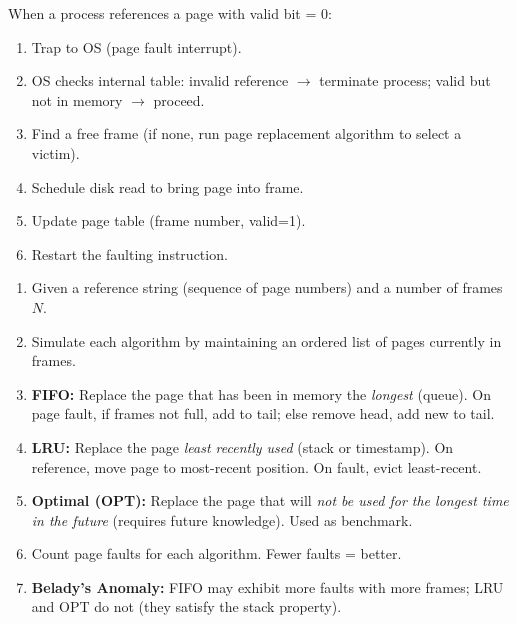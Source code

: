 \documentclass[11pt]{article}
\newcommand{\cle}[1]{{\popxbold\color{popdark}#1}}
\begin{document}
\begin{propriete}
When a process references a page with valid bit = 0:
\begin{enumerate}
\item Trap to OS (page fault interrupt).
\item OS checks internal table: invalid reference $\rightarrow$ terminate process; valid but not in memory $\rightarrow$ proceed.
\item Find a free frame (if none, run \cle{page replacement} algorithm to select a victim).
\item Schedule disk read to bring page into frame.
\item Update page table (frame number, valid=1).
\item Restart the faulting instruction.
\end{enumerate}
\end{propriete}

\begin{methode}
\begin{enumerate}
\item Given a \cle{reference string} (sequence of page numbers) and a number of \cle{frames} $N$.
\item Simulate each algorithm by maintaining an ordered list of pages currently in frames.
\item \textbf{FIFO:} Replace the page that has been in memory the \emph{longest} (queue). On page fault, if frames not full, add to tail; else remove head, add new to tail.
\item \textbf{LRU:} Replace the page \emph{least recently used} (stack or timestamp). On reference, move page to most-recent position. On fault, evict least-recent.
\item \textbf{Optimal (OPT):} Replace the page that will \emph{not be used for the longest time in the future} (requires future knowledge). Used as benchmark.
\item Count \cle{page faults} for each algorithm. Fewer faults = better.
\item \textbf{Belady's Anomaly:} FIFO may exhibit more faults with more frames; LRU and OPT do not (they satisfy the stack property).
\end{enumerate}
\end{methode}
\end{document}
